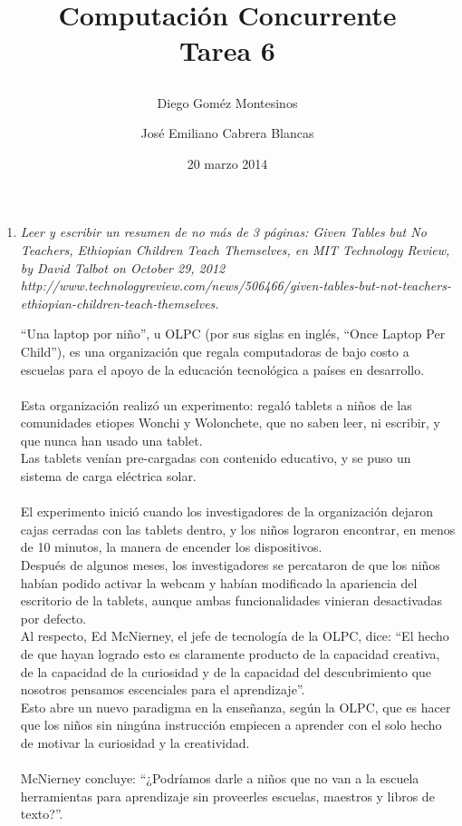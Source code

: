 \documentclass{article}
\title{ Computación Concurrente \\ \Large{Tarea 6}
\author{
  Diego Goméz Montesinos
  \and
  José Emiliano Cabrera Blancas
  }
\date{20 marzo 2014}
}
\begin{document}
\maketitle
\begin{enumerate}
  
  \item{
    \textsl{
      Leer y escribir un resumen de no más de 3 páginas: Given Tables
      but No Teachers, Ethiopian Children Teach Themselves, en MIT
      Technology Review, by David Talbot on October 29, 2012\\
      http://www.technologyreview.com/news/506466/given-tables-but-not-teachers-ethiopian-children-teach-themselves.\\
    } 

    ``Una laptop por niño'', u OLPC (por sus siglas en inglés, ``Once Laptop Per Child''), es una organización que regala
    computadoras de bajo costo a escuelas para el apoyo de la educación tecnológica a países en desarrollo.\\\\
    Esta organización realizó un experimento: regaló tablets a niños de las comunidades etiopes Wonchi y Wolonchete, que no saben leer,
    ni escribir, y que nunca han usado una tablet.\\
    Las tablets venían pre-cargadas con contenido educativo, y se puso un sistema de carga eléctrica solar.\\\\
    El experimento inició cuando los investigadores de la organización dejaron cajas cerradas con las tablets dentro,
    y los niños lograron encontrar, en menos de 10 minutos, la manera de encender los dispositivos.\\
    Después de algunos meses, los investigadores se percataron de que los niños habían podido activar la webcam
    y habían modificado la apariencia del escritorio de la tablets, aunque ambas funcionalidades vinieran
    desactivadas por defecto.\\
    Al respecto, Ed McNierney, el jefe de tecnología de la OLPC, dice: ``El hecho de que hayan logrado esto
    es claramente producto de la capacidad creativa, de la capacidad de la curiosidad y de la capacidad del
    descubrimiento que nosotros pensamos escenciales para el aprendizaje''.\\
    Esto abre un nuevo paradigma en la enseñanza, según la OLPC, que es hacer que los niños sin ningúna instrucción
    empiecen a aprender con el solo hecho de motivar la curiosidad y la creatividad.\\\\
    McNierney concluye: ``¿Podríamos darle a niños que no van a la escuela herramientas para aprendizaje sin
    proveerles escuelas, maestros y libros de texto?''.\\\\
  }
  

\end{enumerate}
\end{document}

